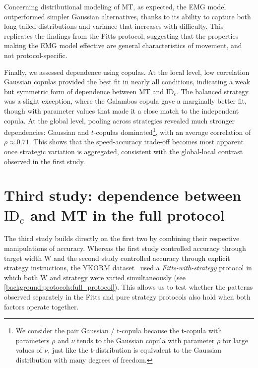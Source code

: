 \documentclass[acmlarge, manuscript,review]{acmart}
\newcommand{\ide}{\ensuremath{{\text{ID}_e}}\xspace}
\newcommand{\W}{\ensuremath{{\text{W}}}\xspace}
\begin{document}
Concerning distributional modeling of MT, as expected, the EMG model outperformed simpler Gaussian alternatives, thanks to its ability to capture both long-tailed distributions and variance that increases with difficulty. This replicates the findings from the Fitts protocol, suggesting that the properties making the EMG model effective are general characteristics of movement, and not protocol-specific.

Finally, we assessed dependence using copulas. At the local level, low correlation Gaussian copulas provided the best fit in nearly all conditions, indicating a weak but symmetric form of dependence between MT and \ide. The balanced strategy was a slight exception, where the Galambos copula gave a marginally better fit, though with parameter values that made it a close match to the independent copula. At the global level, pooling across strategies revealed much stronger dependencies: Gaussian and $t$-copulas dominated\footnote{We consider the pair Gaussian / t-copula because the t-copula with parameters $\rho$ and $\nu$ tends to the Gaussian copula with parameter $\rho$ for large values of $\nu$, just like the t-distribution is equivalent to the Gaussian distribution with many degrees of freedom. %
}, with an average correlation of $\rho \approx 0.71$. This shows that the speed-accuracy trade-off becomes most apparent once strategic variation is aggregated, consistent with the global-local contrast observed in the first study.



\section{ Third study: dependence between \ide and MT in the full protocol \label{sec:yamanaka}}
The third study builds directly on the first two by combining their respective manipulations of accuracy. Whereas the first study controlled accuracy through target width \W and the second study controlled accuracy through explicit strategy instructions, the YKORM dataset~\cite{yamanaka2023} used a \textit{Fitts-with-strategy} protocol in which both \W and strategy were varied simultaneously (see \autoref{background:protocols:full_protocol}). This allows us to test whether the patterns observed separately in the Fitts and pure strategy protocols also hold when both factors operate together.
\end{document}
